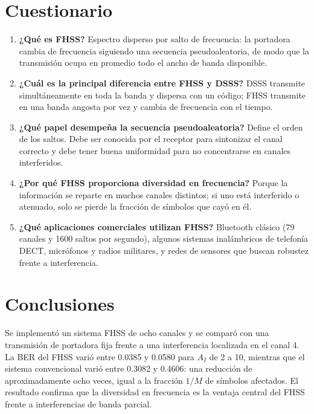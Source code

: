 \documentclass[11pt,a4paper]{article}
\begin{document}
\section{Cuestionario}

\begin{enumerate}
  \item \textbf{¿Qué es FHSS?} Espectro disperso por salto de frecuencia: la portadora
        cambia de frecuencia siguiendo una secuencia pseudoaleatoria, de modo que la
        transmisión ocupa en promedio todo el ancho de banda disponible.
  \item \textbf{¿Cuál es la principal diferencia entre FHSS y DSSS?} DSSS transmite
        simultáneamente en toda la banda y dispersa con un código; FHSS transmite en una
        banda angosta por vez y cambia de frecuencia con el tiempo.
  \item \textbf{¿Qué papel desempeña la secuencia pseudoaleatoria?} Define el orden de los
        saltos. Debe ser conocida por el receptor para sintonizar el canal correcto y debe
        tener buena uniformidad para no concentrarse en canales interferidos.
  \item \textbf{¿Por qué FHSS proporciona diversidad en frecuencia?} Porque la información
        se reparte en muchos canales distintos; si uno está interferido o atenuado, solo
        se pierde la fracción de símbolos que cayó en él.
  \item \textbf{¿Qué aplicaciones comerciales utilizan FHSS?} Bluetooth clásico (79 canales
        y 1600 saltos por segundo), algunos sistemas inalámbricos de telefonía DECT,
        micrófonos y radios militares, y redes de sensores que buscan robustez frente a
        interferencia.
\end{enumerate}

\section{Conclusiones}

Se implementó un sistema FHSS de ocho canales y se comparó con una transmisión de
portadora fija frente a una interferencia localizada en el canal 4. La BER del FHSS varió
entre 0.0385 y 0.0580 para $A_I$ de 2 a 10, mientras que el sistema convencional varió
entre 0.3082 y 0.4606: una reducción de aproximadamente ocho veces, igual a la fracción
$1/M$ de símbolos afectados. El resultado confirma que la diversidad en frecuencia es la
ventaja central del FHSS frente a interferencias de banda parcial.
\end{document}
